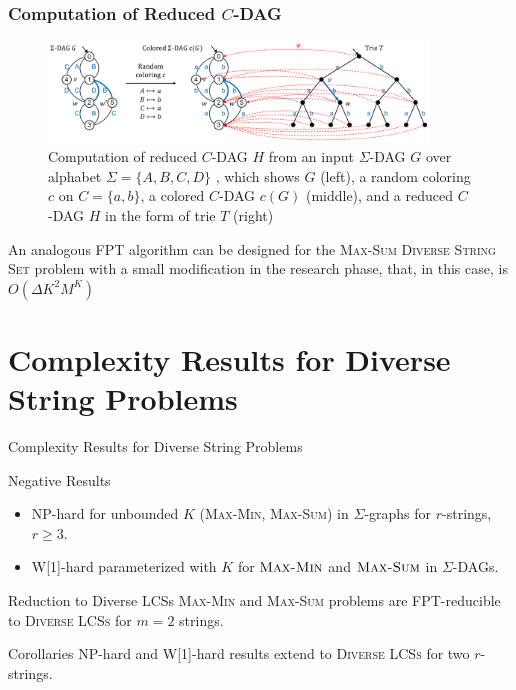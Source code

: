 \documentclass{beamer}
\begin{document}
\begin{frame}
    \frametitle{Computation of Reduced $C$-DAG}
    \begin{figure}[t]
        \baselineskip
        \centering
        \vspace{-0.5\baselineskip}
        \includegraphics[width=0.9\textwidth,angle=0]{./figfptalgo}
        \caption{Computation of reduced $C$-DAG $H$ from an input $\Sigma$-DAG $G$ over alphabet $\Sigma = \{A, B, C, D\}$ , which shows $G$  (left), a random coloring $c$ on $C = \{a,b\}$, a colored $C$-DAG $c(G)$ (middle), and a reduced $C$-DAG $H$ in the form of trie $T$ (right)}\label{fig:fptalgo}
    \end{figure}

    \begin{block}{}
        An analogous FPT algorithm can be designed for the \textsc{Max-Sum Diverse String Set} problem with a small modification in the research phase, that, in this case, is  $O(\Delta K^2 M^K)$
    \end{block}

\end{frame}

\section{Complexity Results for Diverse String Problems}

\begin{frame}{Complexity Results for Diverse String Problems}
    \begin{block}{Negative Results}
        \begin{itemize}
            \item NP-hard for unbounded $K$ (\textsc{Max-Min}, \textsc{Max-Sum}) in $\Sigma$-graphs for $r$-strings, $r \ge 3$.
            \item W[1]-hard parameterized with $K$ for $\textsc{Max-Min}$ and $\textsc{Max-Sum}$ in $\Sigma$-DAGs.
        \end{itemize}
    \end{block}

    \begin{block}{Reduction to Diverse LCSs}
        \textsc{Max-Min} and \textsc{Max-Sum} problems are FPT-reducible to \textsc{Diverse LCSs} for $m=2$ strings.
    \end{block}

    \begin{block}{Corollaries}
        NP-hard and W[1]-hard results extend to \textsc{Diverse LCSs} for two $r$-strings.
    \end{block}
\end{frame}
\end{document}
